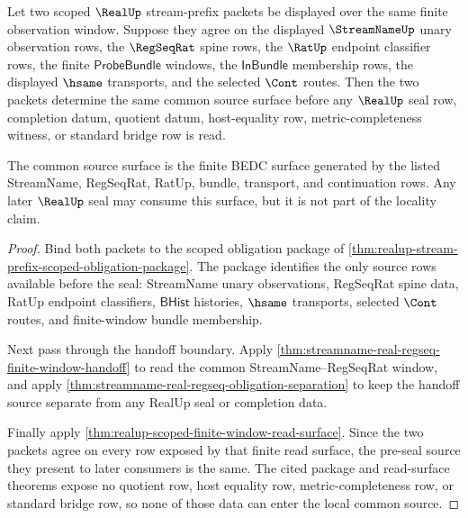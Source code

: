 \begin{theorem}
\label{thm:realup-regseqrat-streamname-common-source-locality}
Let two scoped $\RealUp$ stream-prefix packets be displayed over the same
finite observation window. Suppose they agree on the displayed
$\StreamNameUp$ unary observation rows, the $\RegSeqRat$ spine rows, the
$\RatUp$ endpoint classifier rows, the finite $\mathsf{ProbeBundle}$ windows,
the $\mathsf{InBundle}$ membership rows, the displayed $\hsame$ transports,
and the selected $\Cont$ routes. Then the two packets determine the same
common source surface before any $\RealUp$ seal row, completion datum, quotient
datum, host-equality row, metric-completeness witness, or standard bridge row
is read.

The common source surface is the finite BEDC surface generated by the listed
StreamName, RegSeqRat, RatUp, bundle, transport, and continuation rows. Any
later $\RealUp$ seal may consume this surface, but it is not part of the
locality claim.
\end{theorem}
\begin{proof}
Bind both packets to the scoped obligation package of
\autoref{thm:realup-stream-prefix-scoped-obligation-package}. The package
identifies the only source rows available before the seal: StreamName unary
observations, RegSeqRat spine data, RatUp endpoint classifiers,
$\mathsf{BHist}$ histories, $\hsame$ transports, selected $\Cont$ routes, and
finite-window bundle membership.

Next pass through the handoff boundary. Apply
\autoref{thm:streamname-real-regseq-finite-window-handoff} to read the common
StreamName--RegSeqRat window, and apply
\autoref{thm:streamname-real-regseq-obligation-separation} to keep the handoff
source separate from any RealUp seal or completion data.

Finally apply \autoref{thm:realup-scoped-finite-window-read-surface}. Since
the two packets agree on every row exposed by that finite read surface, the
pre-seal source they present to later consumers is the same. The cited package
and read-surface theorems expose no quotient row, host equality row,
metric-completeness row, or standard bridge row, so none of those data can
enter the local common source.
\end{proof}

